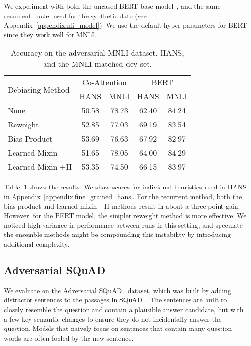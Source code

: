 \documentclass[11pt,a4paper]{article}
\begin{document}
 We experiment with both the uncased BERT base model~\cite{devlin2018bert}, and the same recurrent model used for the synthetic data (see Appendix~\ref{appendix:nli_model}). We use the default hyper-parameters for BERT since they work well for MNLI.

\begin{table}
\centering
    \tablefont
\begin{tabular}{lcccc} \toprule
\multirow{2}{*}{Debiasing Method} & \multicolumn{2}{c}{Co-Attention} & \multicolumn{2}{c}{BERT}\\
 & HANS & MNLI & HANS & MNLI\\ \midrule
None & 50.58 & 78.73 & 62.40 & 84.24 \\
Reweight & 52.85 & 77.03 & 69.19 & 83.54 \\
Bias Product & 53.69 & 76.63 & 67.92 & 82.97 \\
Learned-Mixin & 51.65 & 78.05 & 64.00 & 84.29 \\
Learned-Mixin +H & 53.35 & 74.50 & 66.15 & 83.97 \\
\bottomrule
\end{tabular}   
\caption{Accuracy on the adversarial MNLI dataset, HANS, and the MNLI matched dev set.}
\label{tab:hans}
\end{table}
 
Table~\ref{tab:hans} shows the results. We show scores for individual heuristics used in HANS in Appendix~\ref{appendix:fine_grained_hans}. For the recurrent method, both the bias product and learned-mixin +H methods result in about a three point gain. However, for the BERT model, the simpler reweight method is more effective. 
We noticed high variance in performance between runs in this setting, and speculate the ensemble methods might be compounding this instability by introducing additional complexity.


\subsection{Adversarial SQuAD}
\label{sect:adverserial_squad}
 We evaluate on the Adversarial SQuAD~\cite{adversarial_squad} dataset, which was built by adding distractor sentences to the passages in SQuAD~\cite{squad}. The sentences are built to closely resemble the question and contain a plausible answer candidate, but with a few key semantic changes to ensure they do not incidentally answer the question. Models that naively focus on sentences that contain many question words are often fooled by the new sentence.
\end{document}
